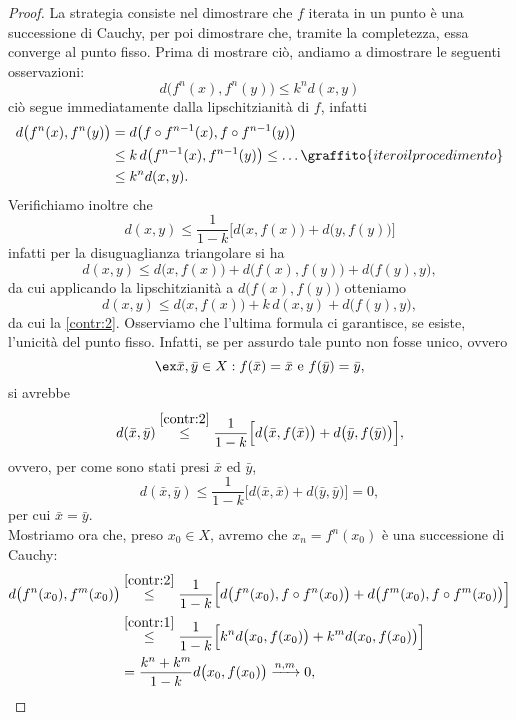\begin{proof}
	La strategia consiste nel dimostrare che \(f\) iterata in un punto è una successione di Cauchy, per poi dimostrare che, tramite la completezza, essa converge al punto fisso.
	Prima di mostrare ciò, andiamo a dimostrare le seguenti osservazioni:
	\begin{equation}\label{contr:1}
		d\big(f^n(x),f^n(y)\big)\le k^n d(x,y)
	\end{equation}
	ciò segue immediatamente dalla lipschitzianità di \(f\), infatti
	\[
		\begin{split}
			d\big(f^n(x),f^n(y)\big) & =d\big(f\circ f^{n-1}(x),f\circ f^{n-1}(y)\big)\\
			& \le k\,d\big(f^{n-1}(x),f^{n-1}(y)\big)\le\dots\graffito{itero il procedimento}\\
			& \le k^n d(x,y).
		\end{split}
	\]
	Verifichiamo inoltre che
	\begin{equation}\label{contr:2}
		d(x,y)\le\frac{1}{1-k}\Big[d\big(x,f(x)\big)+d\big(y,f(y)\big)\Big]
	\end{equation}
	infatti per la disuguaglianza triangolare si ha
	\[
		d(x,y)\le d\big(x,f(x)\big)+d\big(f(x),f(y)\big)+d\big(f(y),y\big),
	\]
	da cui applicando la lipschitzianità a \(d\big(f(x),f(y)\big)\) otteniamo
	\[
		d(x,y)\le d\big(x,f(x)\big)+k\,d(x,y)+d\big(f(y),y\big),
	\]
	da cui la \eqref{contr:2}.
	Osserviamo che l'ultima formula ci garantisce, se esiste, l'unicità del punto fisso.
	Infatti, se per assurdo tale punto non fosse unico, ovvero
	\[
		\ex\bar{x},\bar{y}\in X:f(\bar{x})=\bar{x}\text{ e }f(\bar{y})=\bar{y},
	\]
	si avrebbe
	\[
		d(\bar{x},\bar{y})\overset{\eqref{contr:2}}{\le}\frac{1}{1-k}\Big[d\big(\bar{x},f(\bar{x})\big)+d\big(\bar{y},f(\bar{y})\big)\Big],
	\]
	ovvero, per come sono stati presi \(\bar{x}\) ed \(\bar{y}\),
	\[
		d(\bar{x},\bar{y})\le\frac{1}{1-k}\Big[d\big(\bar{x},\bar{x}\big)+d\big(\bar{y},\bar{y}\big)\Big]=0,
	\]
	per cui \(\bar{x}=\bar{y}\).\\
	Mostriamo ora che, preso \(x_0\in X\), avremo che \(x_n=f^n(x_0)\) è una successione di Cauchy:
	\[
		\begin{split}
			d\big(f^n(x_0),f^m(x_0)\big) & \overset{\eqref{contr:2}}{\le}\frac{1}{1-k}\Big[d\big(f^n(x_0),f\circ f^n(x_0)\big)+d\big(f^m(x_0),f\circ f^m(x_0)\big)\Big]\\
			& \overset{\eqref{contr:1}}{\le}\frac{1}{1-k}\Big[k^n d\big(x_0,f(x_0)\big)+k^m d(x_0,f(x_0)\big)\Big]\\
			& =\frac{k^n+k^m}{1-k}d\big(x_0,f(x_0)\big)\xrightarrow{n,m}0,

\end{split}\]
\end{proof}

